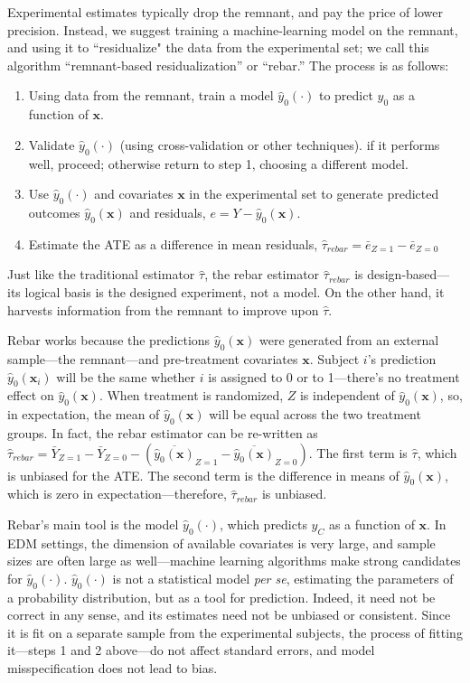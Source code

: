 \documentclass{edm_template}
\newcommand{\tauhat}{\hat{\tau}}
\newcommand{\rebar}{\hat{\tau}_{rebar}}
\newcommand{\model}{\hat{y}_0(\cdot)}
\newcommand{\pred}{\hat{y}_0(\bm{x})}
\newcommand{\predi}{\hat{y}_0(\bm{x}_i)}
\begin{document}
Experimental estimates typically drop the remnant, and pay the price of lower precision. 
Instead, we suggest training a machine-learning model on the remnant, and using it to ``residualize" the data from the experimental set; we call this algorithm ``remnant-based residualization'' or ``rebar.''
The process is as follows:
\begin{enumerate}
 \item Using data from the remnant, train a model $\model$ to predict $y_0$ as a function of $\bm{x}$.
 \item Validate $\model$ (using cross-validation or other techniques). if it performs well, proceed; otherwise return to step 1, choosing a different model.
 \item Use $\model$ and covariates $\bm{x}$ in the experimental set to generate predicted outcomes $\pred$ and residuals, $e=Y-\pred$.
 \item Estimate the ATE as a difference in mean residuals, $\rebar=\bar{e}_{Z=1}-\bar{e}_{Z=0}$
\end{enumerate}
Just like the traditional estimator $\tauhat$, the rebar estimator $\rebar$ is design-based---its logical basis is the designed experiment, not a model. 
On the other hand, it harvests information from the remnant to improve upon $\tauhat$.

Rebar works because the predictions $\pred$ were generated from an external sample---the remnant---and pre-treatment covariates $\bm{x}$.
Subject $i$'s prediction $\predi$ will be the same whether $i$ is assigned to 0 or to 1---there's no treatment effect on $\pred$.
When treatment is randomized, $Z$ is independent of $\pred$, so, in expectation, the mean of $\pred$ will be equal across the two treatment groups.
  In fact, the rebar estimator can be re-written as $\rebar=\bar{Y}_{Z=1}-\bar{Y}_{Z=0}-(\overline{\pred}_{Z=1}-\overline{\pred}_{Z=0})$. 
The first term is $\tauhat$, which is unbiased for the ATE. The second term is the difference in means of $\pred$, which is zero in expectation---therefore, $\rebar$ is unbiased. 

Rebar's main tool is the model $\model$, which predicts $y_C$ as a function of $\bm{x}$. 
In EDM settings, the dimension of available covariates is very large, and sample sizes are often large as well---machine learning algorithms make strong candidates for $\model$.
$\model$ is not a statistical model \emph{per se}, estimating the parameters of a probability distribution, but as a tool for prediction.
Indeed, it need not be correct in any sense, and its estimates need not be unbiased or consistent. 
Since it is fit on a separate sample from the experimental subjects, the process of fitting it---steps 1 and 2 above---do not affect standard errors, and model misspecification does not lead to bias.
\end{document}
